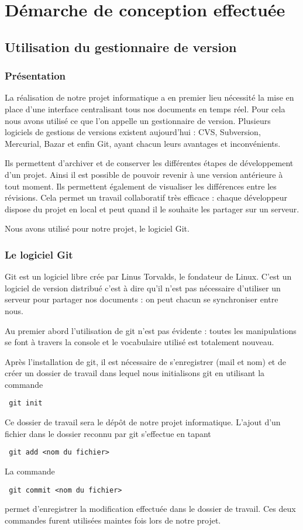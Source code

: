 \chapter{D\'emarche de conception effectu\'ee}
\label{chap:outils utilises}

\section{Utilisation du gestionnaire de version }
\subsection{Pr\'esentation}
La r\'ealisation de notre projet informatique a en premier lieu n\'ecessit\'e la mise en place d'une interface centralisant tous nos
documents en temps r\'eel. Pour cela nous avons utilis\'e ce que l'on appelle un gestionnaire de version. Plusieurs logiciels de gestions 
de versions existent aujourd'hui : CVS, Subversion, Mercurial, Bazar et enfin Git\cite{git}, ayant chacun leurs avantages et inconv\'enients. 

Ils permettent d'archiver et de conserver les diff\'erentes \'etapes de d\'eveloppement d'un projet. Ainsi il est possible de pouvoir revenir
\`a une version ant\'erieure \`a tout moment. Ils permettent \'egalement de visualiser les diff\'erences entre les r\'evisions. Cela permet un  
travail collaboratif tr\`es efficace : chaque d\'eveloppeur dispose du projet en local et peut quand il le souhaite les partager sur un serveur.

Nous avons utilis\'e pour notre projet\citep{projet11efr}, le logiciel Git.

\subsection{Le logiciel Git}
Git est un logiciel libre cr\'ee par Linus Torvalds, le fondateur de Linux. C'est un logiciel de version distribu\'e c'est \`a dire qu'il n'est
 pas n\'ecessaire d'utiliser un serveur pour partager nos documents : on peut chacun se synchroniser entre nous.

Au premier abord l'utilisation de git n'est pas \'evidente : toutes les manipulations se font \`a travers la console et le vocabulaire utilis\'e 
est totalement nouveau. 

Apr\`es l'installation de git, il est n\'ecessaire de s'enregistrer (mail et nom) et de cr\'eer un dossier de travail dans lequel nous 
initialisons git en utilisant la commande
\begin{verbatim} git init \end{verbatim}
Ce dossier de travail sera le d\'ep\^ot de notre projet informatique. L'ajout d'un fichier dans le dossier reconnu par git s'effectue en tapant
\begin{verbatim} git add <nom du fichier> \end{verbatim}
La commande
\begin{verbatim} git commit <nom du fichier> \end{verbatim} permet d'enregistrer la modification effectu\'ee dans le dossier de travail.
Ces deux commandes furent utilis\'ees maintes fois lors de notre projet. 

